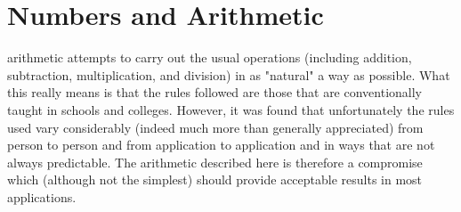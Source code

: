 \chapter{Numbers and Arithmetic}\label{refnums}
\index{,}
\index{,}
\index{,}
\index{,}
\index{,}
 \nr{} arithmetic attempts to carry out the usual operations
(including addition, subtraction, multiplication, and division) in as
"natural" a way as possible.
What this really means is that the rules followed are those that are
conventionally taught in schools and colleges.
However, it was found that unfortunately the rules used vary
considerably (indeed much more than generally appreciated) from person
to person and from application to application and in ways that are not
always predictable.
The \nr{} arithmetic described here is therefore a compromise which
(although not the simplest) should provide acceptable results in most
applications.
\section{}\label{}
 
